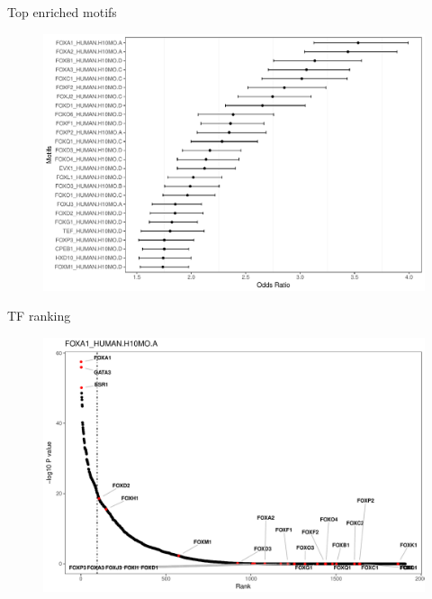 \documentclass[slidestop,compress,11pt,xcolor=dvipsnames]{beamer}
\begin{document}
\begin{frame}{Top enriched motifs}
 \vspace*{-0.3cm}
 \begin{figure}
  \centering
  \includegraphics[width=1.0\linewidth]{ELMER/Motif_top.pdf}
 \end{figure}
\end{frame}

\begin{frame}{TF ranking}
 \vspace*{-0.3cm}
 \begin{figure}
  \centering
  \includegraphics[width=1.0\linewidth]{ELMER/TF_FOXA1.pdf}
 \end{figure}
\end{frame}
\end{document}
